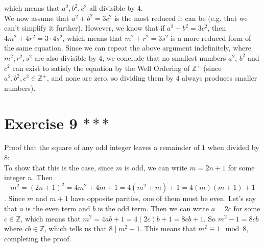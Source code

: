 \documentclass[12pt]{article}
\newcommand{\Z}{\mathbb{Z}}
\begin{document}
    which means that $a^2, b^2, c^2$ all divisible by $4$. \\
    We now assume that $a^2 + b^2 = 3c^2$
    is the most reduced it can be
    (e.g. that we can't simplify it further).
    However, we know that if $a^2 + b^2 = 3c^2$,
    then $4m^2 + 4r^2 = 3 \cdot 4s^2$,
    which means that $m^2 + r^2 = 3s^2$
    is a more reduced form of the same equation. 
    Since we can repeat the above argument indefinitely,
    where $m^2, r^2, s^2$ are also divisible by $4$,
    we conclude that no smallest numbers $a^2$, $b^2$ and $c^2$
    can exist to satisfy the equation
    by the Well Ordering of $\Z^+$
    (since $a^2, b^2, c^2 \in \Z^+$,
    and none are zero,
    so dividing them by $4$ always produces smaller numbers). \\

    \section*{Exercise 9 $***$}
    Proof that the square of any odd integer leaves
    a remainder of $1$ when divided by $8$: \\
    To show that this is the case, since $m$ is odd,
    we can write $m = 2n+1$ for some integer $n$.
    Then
    \[ m^2 = (2n+1)^2 = 4m^2+4m+1 = 4(m^2 + m) + 1
    = 4(m)(m+1) + 1 \].
    Since $m$ and $m+1$ have opposite parities,
    one of them must be even.
    Let's say that $a$ is the even term and $b$ is the odd term.
    Then we can write $a = 2c$ for some $c \in \Z$,
    which means that $m^2 = 4ab + 1 = 4(2c)b + 1 = 8cb + 1$.
    So $m^2 - 1 = 8cb$ where $cb \in \Z$,
    which tells us that $8 \mid m^2 - 1$.
    This means that $m^2 \equiv 1 \mod 8$,
    completing the proof. \\
\end{document}
